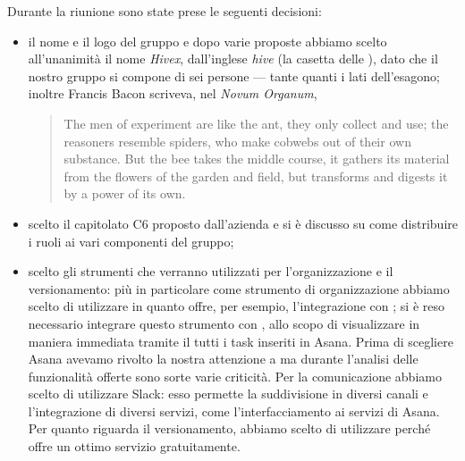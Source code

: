 Durante la riunione sono state prese le seguenti decisioni:
\begin{itemize}
\item il nome e il logo del gruppo e dopo varie proposte abbiamo scelto all'unanimità il nome \emph{Hivex}, dall'inglese \emph{hive} (la casetta delle ), dato che il nostro gruppo si compone di sei persone --- tante quanti i lati dell'esagono; inoltre Francis Bacon scriveva, nel \emph{Novum Organum},
\begin{quote}
	The men of experiment are like the ant, they only collect and use; the reasoners resemble spiders, who make cobwebs out of their own substance. But the bee takes the middle course, it gathers its material from the flowers of the garden and field, but transforms and digests it by a power of its own.
\end{quote}

\item scelto il capitolato C6 \proj{} proposto dall'azienda \ZU{} e si è discusso su come distribuire i ruoli ai vari componenti del gruppo;
\item scelto gli strumenti che verranno utilizzati per l'organizzazione e il versionamento: più in particolare come strumento di organizzazione abbiamo scelto di utilizzare  in quanto offre, per esempio, l'integrazione con ; si è reso necessario integrare questo strumento con , allo scopo di visualizzare in maniera immediata tramite il  tutti i task inseriti in Asana. Prima di scegliere Asana avevamo rivolto la nostra attenzione a  ma durante l'analisi delle funzionalità offerte sono sorte varie criticità. Per la comunicazione abbiamo scelto di utilizzare Slack: esso permette la suddivisione in diversi canali e l'integrazione di diversi servizi, come l'interfacciamento ai servizi di Asana. Per quanto riguarda il versionamento, abbiamo scelto di utilizzare   perché offre un ottimo servizio gratuitamente.
\end{itemize}

